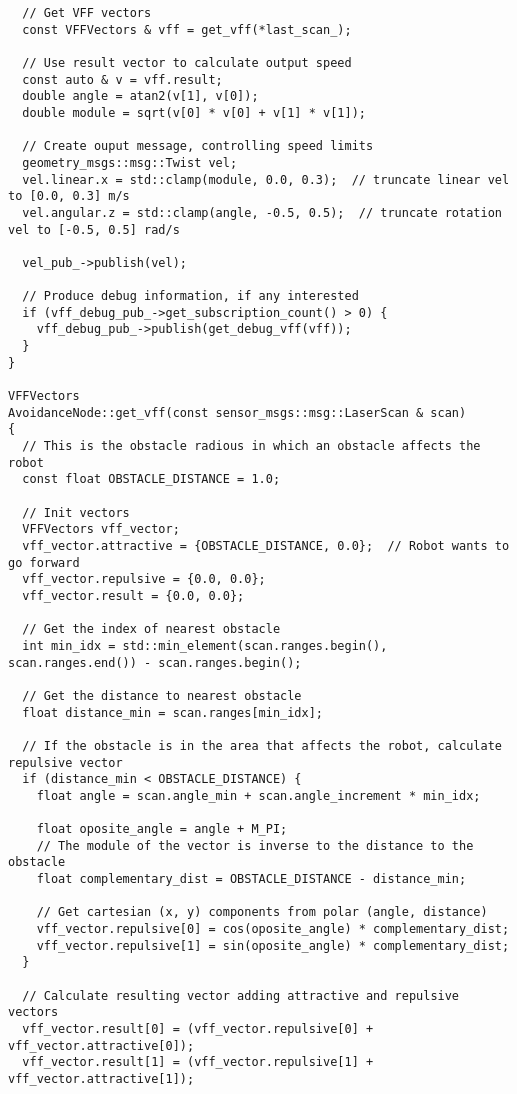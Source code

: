 \begin{tcolorbox}[sharp corners, colframe=gray!80, colback=LightGray, left=0pt, top=0pt, bottom=0pt, title=\texttt{br2\_vff\_avoidance/src/br2\_vff\_avoidance/AvoidanceNode.cpp}]
\begin{verbatim}
  // Get VFF vectors
  const VFFVectors & vff = get_vff(*last_scan_);

  // Use result vector to calculate output speed
  const auto & v = vff.result;
  double angle = atan2(v[1], v[0]);
  double module = sqrt(v[0] * v[0] + v[1] * v[1]);

  // Create ouput message, controlling speed limits
  geometry_msgs::msg::Twist vel;
  vel.linear.x = std::clamp(module, 0.0, 0.3);  // truncate linear vel to [0.0, 0.3] m/s
  vel.angular.z = std::clamp(angle, -0.5, 0.5);  // truncate rotation vel to [-0.5, 0.5] rad/s

  vel_pub_->publish(vel);

  // Produce debug information, if any interested
  if (vff_debug_pub_->get_subscription_count() > 0) {
    vff_debug_pub_->publish(get_debug_vff(vff));
  }
}

VFFVectors
AvoidanceNode::get_vff(const sensor_msgs::msg::LaserScan & scan)
{
  // This is the obstacle radious in which an obstacle affects the robot
  const float OBSTACLE_DISTANCE = 1.0;

  // Init vectors
  VFFVectors vff_vector;
  vff_vector.attractive = {OBSTACLE_DISTANCE, 0.0};  // Robot wants to go forward
  vff_vector.repulsive = {0.0, 0.0};
  vff_vector.result = {0.0, 0.0};

  // Get the index of nearest obstacle
  int min_idx = std::min_element(scan.ranges.begin(), scan.ranges.end()) - scan.ranges.begin();

  // Get the distance to nearest obstacle
  float distance_min = scan.ranges[min_idx];

  // If the obstacle is in the area that affects the robot, calculate repulsive vector
  if (distance_min < OBSTACLE_DISTANCE) {
    float angle = scan.angle_min + scan.angle_increment * min_idx;

    float oposite_angle = angle + M_PI;
    // The module of the vector is inverse to the distance to the obstacle
    float complementary_dist = OBSTACLE_DISTANCE - distance_min;

    // Get cartesian (x, y) components from polar (angle, distance)
    vff_vector.repulsive[0] = cos(oposite_angle) * complementary_dist;
    vff_vector.repulsive[1] = sin(oposite_angle) * complementary_dist;
  }

  // Calculate resulting vector adding attractive and repulsive vectors
  vff_vector.result[0] = (vff_vector.repulsive[0] + vff_vector.attractive[0]);
  vff_vector.result[1] = (vff_vector.repulsive[1] + vff_vector.attractive[1]);


\end{verbatim}
\end{tcolorbox}
